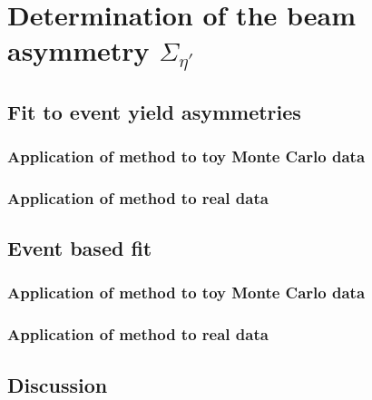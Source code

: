 \chapter{Determination of the beam asymmetry $\Sigma_{\eta'}$}
\section{Fit to event yield asymmetries}
\subsection{Application of method to toy Monte Carlo data}
\subsection{Application of method to real data}

\section{Event based fit}
\subsection{Application of method to toy Monte Carlo data}
\subsection{Application of method to real data}

\section{Discussion}